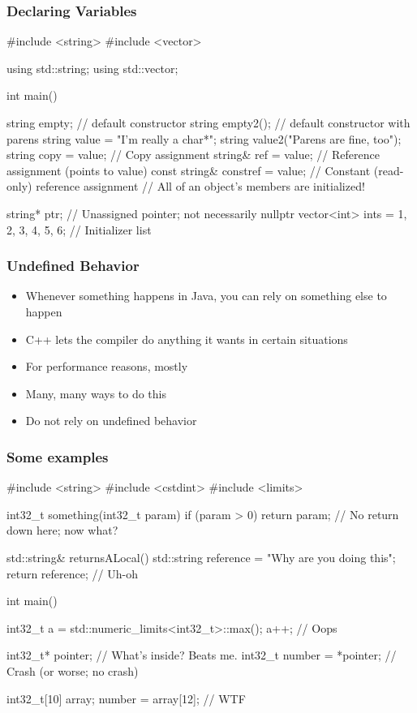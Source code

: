 \documentclass[glossy]{beamer}
\begin{document}
\begin{frame}[fragile=singleslide]
  \frametitle{Declaring Variables}
  \begin{cppcode}
#include <string>
#include <vector>

using std::string;
using std::vector;

int main() {
  string empty; // default constructor
  string empty2(); // default constructor with parens
  string value = "I'm really a char*";
  string value2("Parens are fine, too");
  string copy = value; // Copy assignment
  string& ref = value; // Reference assignment (points to value)
  const string& constref = value; // Constant (read-only) reference assignment
  // All of an object's members are initialized!

  string* ptr; // Unassigned pointer; not necessarily nullptr
  vector<int> ints = {1, 2, 3, 4, 5, 6}; // Initializer list
}
  \end{cppcode}
\end{frame}

\begin{frame}[fragile=singleslide]
  \frametitle{Undefined Behavior}
  \begin{itemize}
    \item Whenever something happens in Java, you can rely on something else to happen
    \item C++ lets the compiler do anything it wants in certain situations
    \item For performance reasons, mostly
    \item Many, many ways to do this
    \item Do not rely on undefined behavior
  \end{itemize}
\end{frame}

\begin{frame}[fragile=singleslide]
  \frametitle{Some examples}
  \begin{cppcode}
#include <string>
#include <cstdint> 
#include <limits> 

int32_t something(int32_t param) { 
  if (param > 0) return param; 
  // No return down here; now what? 
} 

std::string& returnsALocal() { 
  std::string reference = "Why are you doing this"; 
  return reference; // Uh-oh 
} 

int main() { 
  int32_t a = std::numeric_limits<int32_t>::max(); 
  a++; // Oops 

  int32_t* pointer; // What's inside?  Beats me.
  int32_t number = *pointer; // Crash (or worse; no crash)

  int32_t[10] array; 
  number = array[12]; // WTF 
}
  \end{cppcode}
\end{frame}
\end{document}
